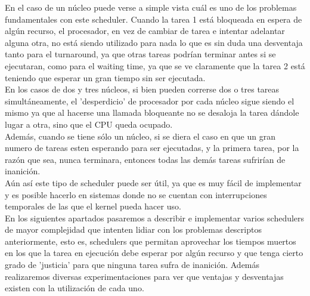 En el caso de un núcleo puede verse a simple vista cuál es uno de los problemas fundamentales con este scheduler. Cuando la tarea 1 está bloqueada en espera de algún recurso, el procesador, en vez de cambiar de tarea e intentar adelantar alguna otra, no está siendo utilizado para nada lo que es sin duda una desventaja tanto para el turnaround, ya que otras tareas podrían terminar antes si se ejecutaran, como para el waiting time, ya que se ve claramente que la tarea 2 está teniendo que esperar un gran tiempo sin ser ejecutada.
\\
En los casos de dos y tres núcleos, si bien pueden correrse dos o tres tareas simultáneamente, el 'desperdicio' de procesador por cada núcleo sigue siendo el mismo ya que al hacerse una llamada bloqueante no se desaloja la tarea dándole lugar a otra, sino que el CPU queda ocupado.
\\
Además, cuando se tiene sólo un núcleo, si se diera el caso en que un gran numero de tareas esten esperando para ser ejecutadas, y la primera tarea, por la razón que sea, nunca terminara, entonces todas las demás tareas sufrirían de inanición.
\\
Aún así este tipo de scheduler puede ser útil, ya que es muy fácil de implementar y es posible hacerlo en sistemas donde no se cuentan con interrupciones temporales de las que el kernel pueda hacer uso.
\\
En los siguientes apartados pasaremos a describir e implementar varios schedulers de mayor complejidad que intenten lidiar con los problemas descriptos anteriormente, esto es, schedulers que permitan aprovechar los tiempos muertos en los que la tarea en ejecución debe esperar por algún recurso y que tenga cierto grado de 'justicia' para que ninguna tarea sufra de inanición. Además realizaremos diversas experimentaciones para ver que ventajas y desventajas existen con la utilización de cada uno.
